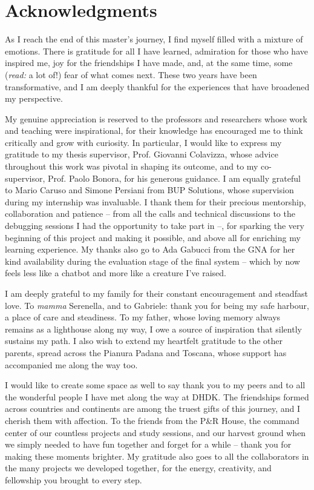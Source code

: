 \chapter{Acknowledgments}

\begin{spacing}{1.5}
As I reach the end of this master’s journey, I find myself filled with a mixture of emotions. There is gratitude for all I have learned, admiration for those who have inspired me, joy for the friendships I have made, and, at the same time, some (\textit{read:} a lot of!) fear of what comes next. These two years have been transformative, and I am deeply thankful for the experiences that have broadened my perspective.

My genuine appreciation is reserved to the professors and researchers whose work and teaching were inspirational, for their knowledge has encouraged me to think critically and grow with curiosity. In particular, I would like to express my gratitude to my thesis supervisor, Prof. Giovanni Colavizza, whose advice throughout this work was pivotal in shaping its outcome, and to my co-supervisor, Prof. Paolo Bonora, for his generous guidance. I am equally grateful to Mario Caruso and Simone Persiani from BUP Solutions, whose supervision during my internship was invaluable. I thank them for their precious mentorship, collaboration and patience -- from all the calls and technical discussions to the debugging sessions I had the opportunity to take part in --, for sparking the very beginning of this project and making it possible, and above all for enriching my learning experience. My thanks also go to Ada Gabucci from the GNA for her kind availability during the evaluation stage of the final system -- which by now feels less like a chatbot and more like a creature I’ve raised.

I am deeply grateful to my family for their constant encouragement and steadfast love. To \textit{mamma} Serenella, and to Gabriele: thank you for being my safe harbour, a place of care and steadiness. To my father, whose loving memory always remains as a lighthouse along my way, I owe a source of inspiration that silently sustains my path. I also wish to extend my heartfelt gratitude to the other parents, spread across the Pianura Padana and Toscana, whose support has accompanied me along the way too.

I would like to create some space as well to say thank you to my peers and to all the wonderful people I have met along the way at DHDK. The friendships formed across countries and continents are among the truest gifts of this journey, and I cherish them with affection. To the friends from the P\&R House, the command center of our countless projects and study sessions, and our harvest ground when we simply needed to have fun together and forget for a while -- thank you for making these moments brighter. My gratitude also goes to all the collaborators in the many projects we developed together, for the energy, creativity, and fellowship you brought to every step.


\end{spacing}
